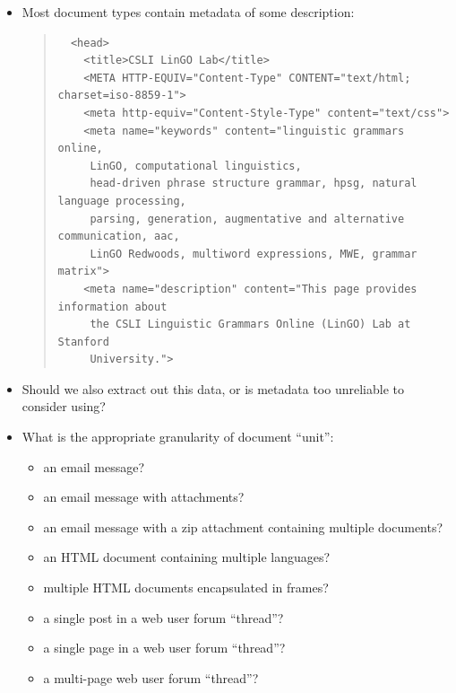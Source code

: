\documentclass[a4paper,landscape,headrule,footrule,xetex]{foils}
\begin{document}
\begin{itemize}
\item Most document types contain metadata of some description:
  \begin{quote}
    \smaller[2]
\begin{verbatim}
  <head>
    <title>CSLI LinGO Lab</title>
    <META HTTP-EQUIV="Content-Type" CONTENT="text/html; charset=iso-8859-1">
    <meta http-equiv="Content-Style-Type" content="text/css">
    <meta name="keywords" content="linguistic grammars online, 
     LinGO, computational linguistics,
     head-driven phrase structure grammar, hpsg, natural language processing,
     parsing, generation, augmentative and alternative communication, aac,
     LinGO Redwoods, multiword expressions, MWE, grammar matrix">
    <meta name="description" content="This page provides information about
     the CSLI Linguistic Grammars Online (LinGO) Lab at Stanford
     University.">
\end{verbatim}
  \end{quote}
\item Should we also extract out this data, or is metadata too
  unreliable to consider using?
\end{itemize}











\begin{itemize}
\item What is the appropriate granularity of document ``unit'':
  \begin{itemize}
  \item an email message?
  \item an email message with attachments?
  \item an email message with a zip attachment containing multiple documents?
  \item an HTML document containing multiple languages?
  \item multiple HTML documents encapsulated in frames?
  \item a single post in a web user forum ``thread''?
  \item a single page in a web user forum ``thread''?
  \item a multi-page web user forum ``thread''?
  \end{itemize}
\end{itemize}
\end{document}
